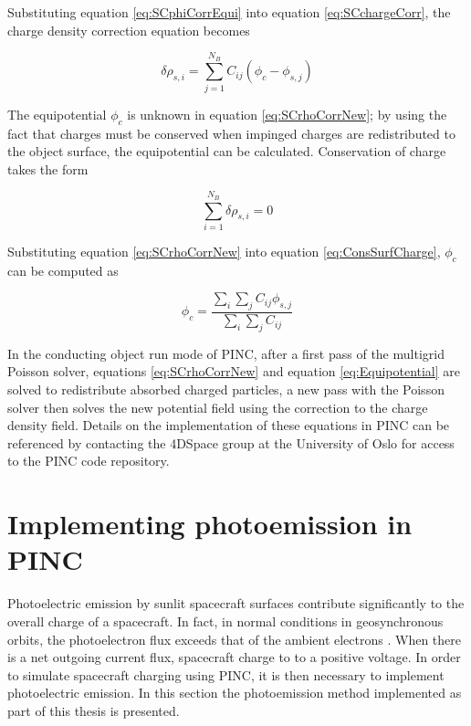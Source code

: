 Substituting equation \eqref{eq:SCphiCorrEqui} into equation \eqref{eq:SCchargeCorr}, the charge density correction equation becomes

\begin{equation}\label{eq:SCrhoCorrNew}
    \delta \rho_{s,i} = \sum^{N_B}_{j=1} C_{ij} (\phi_c - \phi_{s,j})
\end{equation}

The equipotential $\phi_c$ is unknown in equation \eqref{eq:SCrhoCorrNew}; by using the fact that charges must be conserved when impinged charges are redistributed to the object surface, the equipotential can be calculated. Conservation of charge takes the form

\begin{equation}\label{eq:ConsSurfCharge}
    \sum^{N_B}_{i=1} \delta \rho_{s,i} = 0
\end{equation}

Substituting equation \eqref{eq:SCrhoCorrNew} into equation \eqref{eq:ConsSurfCharge}, $\phi_c$ can be computed as

\begin{equation}\label{eq:Equipotential}
    \phi_c = \frac{\sum_i \sum_j C_{ij} \phi_{s,j}}{\sum_i \sum_j C_{ij}}
\end{equation}

In the conducting object run mode of PINC, after a first pass of the multigrid Poisson solver, equations \eqref{eq:SCrhoCorrNew} and equation \eqref{eq:Equipotential} are solved to redistribute absorbed charged particles, a new pass with the Poisson solver then solves the new potential field using the correction to the charge density field. Details on the implementation of these equations in PINC can be referenced by contacting the 4DSpace group at the University of Oslo for access to the PINC code repository.

\newpage

\section{Implementing photoemission in PINC}

Photoelectric emission by sunlit spacecraft surfaces contribute significantly to the overall charge of a spacecraft. In fact, in normal conditions in geosynchronous orbits, the photoelectron flux exceeds that of the ambient electrons \parencite{Lai2006}. When there is a net outgoing current flux, spacecraft charge to to a positive voltage. In order to simulate spacecraft charging using PINC, it is then necessary to implement photoelectric emission. In this section the photoemission method implemented as part of this thesis is presented. 


